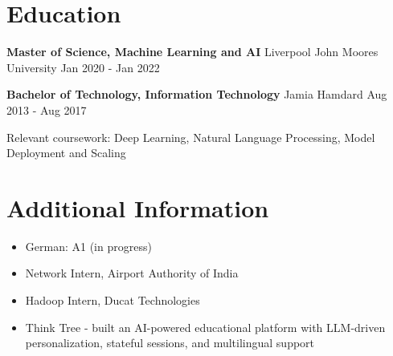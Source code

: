 \documentclass[10pt,a4paper]{article}
\begin{document}
\section{Education}
\textbf{Master of Science, Machine Learning and AI} \textbar{} Liverpool John Moores University \hfill Jan 2020 - Jan 2022\par
\textbf{Bachelor of Technology, Information Technology} \textbar{} Jamia Hamdard \hfill Aug 2013 - Aug 2017\par
Relevant coursework: Deep Learning, Natural Language Processing, Model Deployment and Scaling\par

\section{Additional Information}
\begin{itemize}
  \item German: A1 (in progress)
  \item Network Intern, Airport Authority of India
  \item Hadoop Intern, Ducat Technologies
  \item Think Tree - built an AI-powered educational platform with LLM-driven personalization, stateful sessions, and multilingual support
\end{itemize}
\end{document}
